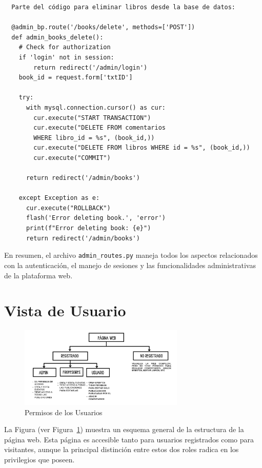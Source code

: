 \documentclass[a4paper, 12pt]{book}
\begin{document}
\begin{verbatim}
  Parte del código para eliminar libros desde la base de datos:

  @admin_bp.route('/books/delete', methods=['POST'])
  def admin_books_delete():
    # Check for authorization
    if 'login' not in session:
        return redirect('/admin/login')
    book_id = request.form['txtID']

    try:
      with mysql.connection.cursor() as cur:
        cur.execute("START TRANSACTION")
        cur.execute("DELETE FROM comentarios 
        WHERE libro_id = %s", (book_id,))
        cur.execute("DELETE FROM libros WHERE id = %s", (book_id,))
        cur.execute("COMMIT")

      return redirect('/admin/books')

    except Exception as e:
      cur.execute("ROLLBACK")
      flash('Error deleting book.', 'error')
      print(f"Error deleting book: {e}")
      return redirect('/admin/books')
\end{verbatim}

En resumen, el archivo \texttt{admin\_routes.py} maneja todos los aspectos relacionados con la autenticación, el manejo de sesiones y las funcionalidades administrativas de la plataforma web.

\section{Vista de Usuario}
\label{sec:vista_usuarios}

\begin{figure}
  \centering
  \includegraphics[width=0.7\textwidth]{img/esquema.png}
  \caption{Permisos de los Usuarios}
  \label{fig:arquitectura}
\end{figure}

La Figura (ver Figura~\ref{fig:arquitectura}) muestra un esquema general de la estructura de la página web. Esta página es accesible tanto para usuarios registrados 
como para visitantes, aunque la principal distinción entre estos dos roles radica en los privilegios que poseen.
\end{document}
